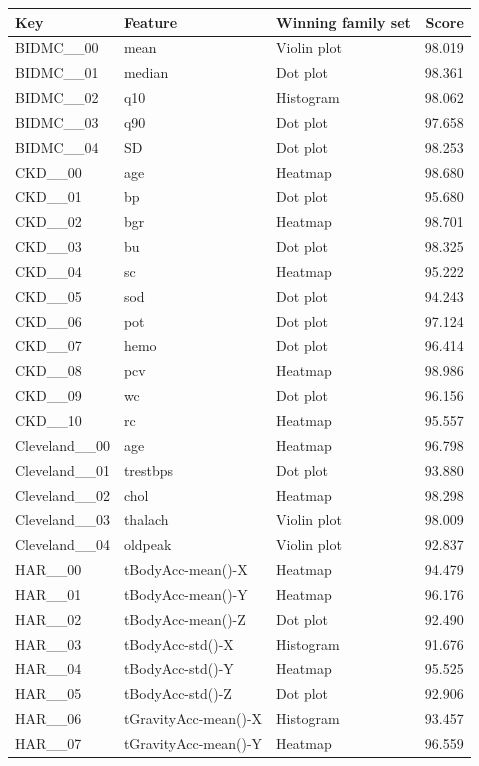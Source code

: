 \begin{longtable}{p{2.7cm}p{5.5cm}p{3.4cm}r}\toprule
Key & Feature & Winning family set & Score\\\midrule\endhead
BIDMC\_\_00 & mean & Violin plot & 98.019\\
BIDMC\_\_01 & median & Dot plot & 98.361\\
BIDMC\_\_02 & q10 & Histogram & 98.062\\
BIDMC\_\_03 & q90 & Dot plot & 97.658\\
BIDMC\_\_04 & SD & Dot plot & 98.253\\
CKD\_\_00 & age & Heatmap & 98.680\\
CKD\_\_01 & bp & Dot plot & 95.680\\
CKD\_\_02 & bgr & Heatmap & 98.701\\
CKD\_\_03 & bu & Dot plot & 98.325\\
CKD\_\_04 & sc & Heatmap & 95.222\\
CKD\_\_05 & sod & Dot plot & 94.243\\
CKD\_\_06 & pot & Dot plot & 97.124\\
CKD\_\_07 & hemo & Dot plot & 96.414\\
CKD\_\_08 & pcv & Heatmap & 98.986\\
CKD\_\_09 & wc & Dot plot & 96.156\\
CKD\_\_10 & rc & Heatmap & 95.557\\
Cleveland\_\_00 & age & Heatmap & 96.798\\
Cleveland\_\_01 & trestbps & Dot plot & 93.880\\
Cleveland\_\_02 & chol & Heatmap & 98.298\\
Cleveland\_\_03 & thalach & Violin plot & 98.009\\
Cleveland\_\_04 & oldpeak & Violin plot & 92.837\\
HAR\_\_00 & tBodyAcc-mean()-X & Heatmap & 94.479\\
HAR\_\_01 & tBodyAcc-mean()-Y & Heatmap & 96.176\\
HAR\_\_02 & tBodyAcc-mean()-Z & Dot plot & 92.490\\
HAR\_\_03 & tBodyAcc-std()-X & Histogram & 91.676\\
HAR\_\_04 & tBodyAcc-std()-Y & Heatmap & 95.525\\
HAR\_\_05 & tBodyAcc-std()-Z & Dot plot & 92.906\\
HAR\_\_06 & tGravityAcc-mean()-X & Histogram & 93.457\\
HAR\_\_07 & tGravityAcc-mean()-Y & Heatmap & 96.559\\

\end{longtable}
